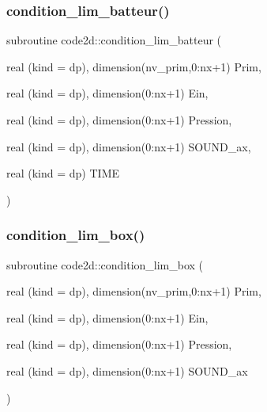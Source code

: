 \subsubsection{\texorpdfstring{condition\+\_\+lim\+\_\+batteur()}{condition\_lim\_batteur()}}
{\footnotesize\ttfamily subroutine code2d\+::condition\+\_\+lim\+\_\+batteur (\begin{DoxyParamCaption}\item[{real (kind = dp), dimension(nv\+\_\+prim,0\+:nx+1)}]{Prim,  }\item[{real (kind = dp), dimension(0\+:nx+1)}]{Ein,  }\item[{real (kind = dp), dimension(0\+:nx+1)}]{Pression,  }\item[{real (kind = dp), dimension(0\+:nx+1)}]{S\+O\+U\+N\+D\+\_\+ax,  }\item[{real (kind = dp)}]{T\+I\+ME }\end{DoxyParamCaption})}

\mbox{\label{main1DOr2_8f90_ae72ce7fe5060af7e7c56122d5232f6c3}} 
\subsubsection{\texorpdfstring{condition\+\_\+lim\+\_\+box()}{condition\_lim\_box()}}
{\footnotesize\ttfamily subroutine code2d\+::condition\+\_\+lim\+\_\+box (\begin{DoxyParamCaption}\item[{real (kind = dp), dimension(nv\+\_\+prim,0\+:nx+1)}]{Prim,  }\item[{real (kind = dp), dimension(0\+:nx+1)}]{Ein,  }\item[{real (kind = dp), dimension(0\+:nx+1)}]{Pression,  }\item[{real (kind = dp), dimension(0\+:nx+1)}]{S\+O\+U\+N\+D\+\_\+ax }\end{DoxyParamCaption})}

\mbox{\label{main1DOr2_8f90_abf21f0faeed0f3974f34fb740d77af75}} 
